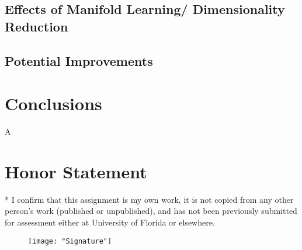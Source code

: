 \documentclass[conference]{IEEEtran}
\begin{document}
\subsection{Effects of Manifold Learning/ Dimensionality Reduction}


\subsection{Potential Improvements}



\section{Conclusions} \label{Conclusions}
A

\section*{Honor Statement}
\noindent
* I confirm that this assignment is my own work, it is not copied from any other person's work (published or unpublished), and has not been previously submitted for assessment either at University of Florida or elsewhere.

\begin{figure}[h!]
	\centering
	\texttt{[image: "Signature"]}
\end{figure}



%
\end{document}
